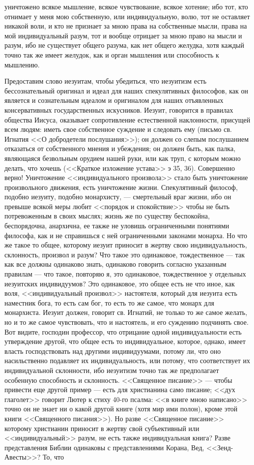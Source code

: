 \documentclass[12pt]{article}
\begin{document}
уничтожено всякое мышление, всякое чувствование, всякое хотение; ибо тот, кто отнимает у меня мою собственную, или индивидуальную, волю, тот не оставляет никакой воли, и кто не признает за мною права на собственные мысли, права на мой индивидуальный разум, тот и вообще отрицает за мною право на мысли и разум, ибо не существует общего разума, как нет общего желудка, хотя каждый точно так же имеет желудок, как и орган мышления или способность к мышлению. 

Предоставим слово иезуитам, чтобы убедиться, что иезуитизм есть бессознательный оригинал и идеал для наших спекулятивных философов, как он является и сознательным идеалом и оригиналом для наших отъявленных консервативных государственных искусников. Иезуит, говорится в правилах общества Иисуса, оказывает сопротивление естественной наклонности, присущей всем людям: иметь свое собственное суждение и следовать ему (письмо св. Игнатия <<О добродетели послушания>>); он должен со слепым послушанием отказаться от собственного мнения и убеждения; он должен быть, как палка, являющаяся безвольным орудием нашей руки, или как труп, с которым можно делать, что хочешь (<<Краткое изложение устава>>  э 35, 36). Совершенно верно! Уничтожение <<индивидуального произвола>>  стало быть уничтожение произвольного движения, есть уничтожение жизни. Спекулятивный философ, подобно иезуиту, подобно монархисту, --- смертельный враг жизни, ибо он превыше всякой меры любит <<порядок и спокойствие>>  чтобы не быть потревоженным в своих мыслях; жизнь же по существу беспокойна, беспорядочна, анархична, ее также не уловишь ограниченными понятиями философа, как и не справишься с ней ограниченными законами монарха. Но что же такое то общее, которому иезуит приносит в жертву свою индивидуальность, склонность, произвол и разум? Что такое это одинаковое, тождественное --- так как все должны одинаково знать, одинаково говорить согласно указанным правилам --- что такое, повторяю я, это одинаковое, тождественное у отдельных иезуитских индивидуумов? Это одинаковое, это общее есть не что иное, как воля, <<индивидуальный произвол>> настоятеля, который для иезуита есть наместник бога, то есть сам бог, то есть то же самое, что монарх для монархиста. Иезуит должен, говорит св. Игнатий, не только то же самое желать, но и то же самое чувствовать, что и настоятель, и его суждению подчинять свое. Вот видите, господин профессор, что отрицание одной индивидуальности есть утверждение другой, что общее есть то индивидуальное, которое, однако, имеет власть господствовать над другими индивидуумами, потому ли, что оно насильственно подавляет их индивидуальность, или потому, что соответствует их индивидуальной склонности, ибо иезуитизм точно так же предполагает особенную способность и склонность. <<Священное писание>> --- чтобы привести еще другой пример --- есть для христианина само писание; <<дух глаголет>>  говорит Лютер к стиху 40-го псалма: <<в книге мною написано>>  точно он не знает ни о какой другой книге (хотя мир ими полон), кроме этой книги <<Священного писания>>). Но разве <<Священное писание>>  которому христианин приносит в жертву свой субъективный или <<индивидуальный>> разум, не есть также индивидуальная книга? Разве представления Библии одинаковы с представлениями Корана, Вед, <<Зенд-Авесты>>? То, что 
\end{document}
